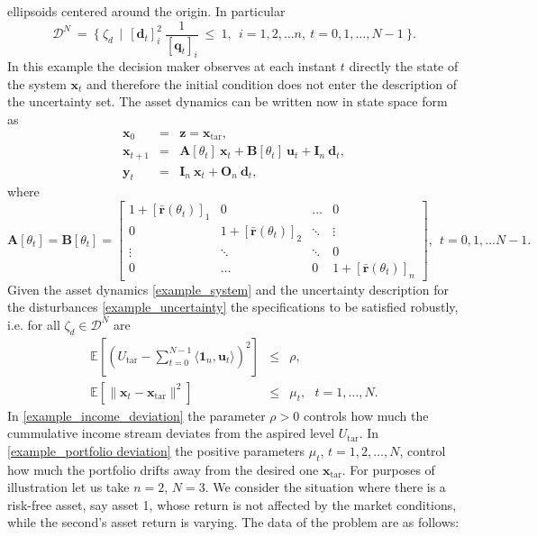 \documentclass[letterpaper,11pt]{article}
\newcommand{\AR}[2]{\left[\begin{array}{#1}#2\end{array}\right]}
\begin{document}
ellipsoids centered around the origin. 
In particular 
\begin{equation}
\label{example_uncertainty}
\mathcal{D}^N ~=~ \{~ \zeta_d ~~ |~~  [\mathbf{d}_{t}]_i^2  ~ \frac{1}{[\mathbf{q}_{t}]_i} ~ \leq ~ 1, ~~ i = 1, 2, \hdots n, ~ t = 0,1, \hdots, N-1 ~\}.
\end{equation}
In this example the decision maker observes at each instant $t$ directly the  state of the system $ \mathbf{x}_t$
and therefore the initial condition does not enter the description of the uncertainty set. 
The asset dynamics can be written now in state space form as
\begin{eqnarray}
\label{example_system}
\nonumber
\mathbf{x}_0 & = & \mathbf{z} = \mathbf{x}_{\text{tar}}, \\
\nonumber
\mathbf{x}_{t+1} & = &  \mathbf{A}[\theta_t] ~ \mathbf{x}_t + \mathbf{B}[\theta_t] ~ \mathbf{u}_t + 
\mathbf{I}_n ~ \mathbf{d}_t,  \\
\mathbf{y}_t  & = &\mathbf{I}_n ~ \mathbf{x}_t + \mathbf{O}_n ~ \mathbf{d}_t, 
\end{eqnarray}
where 
$$
\mathbf{A}[\theta_t] = \mathbf{B}[\theta_t] = \AR{cccc}{   1 +  [ \bar{\mathbf{r}}(\theta_t)]_1  & 0& \hdots & 0\\ 
	0	&  1 +  [ \bar{\mathbf{r}}(\theta_t)]_2 & \ddots& \vdots\\
	\vdots & \ddots & \ddots & 0\\ 
	0& \hdots & 0&  1 +  [ \bar{\mathbf{r}}(\theta_t)]_n}, ~~t =0,1, \hdots N-1.
$$
Given the asset dynamics \eqref{example_system} and the uncertainty description for the disturbances 
\eqref{example_uncertainty} the specifications to be satisfied robustly, i.e. for all $\zeta_d \in  \mathcal{D}^N$ are
\begin{eqnarray}
\label{example_income_deviation}
\mathbb{E}[(U_{\text{tar}} -\sum_{t=0}^{N-1} \langle \mathbf{1}_n, \mathbf{u}_t \rangle)^2  ] 
& \leq &\rho, \\
\label{example_portfolio deviation}
\mathbb{E}[ \|\mathbf{x}_t-\mathbf{x}_{\text{tar}} \|^2  ] & \leq & \mu_t,~~~ t = 1, \hdots, N.
\end{eqnarray}
In \eqref{example_income_deviation} the parameter $ \rho > 0 $ controls how much 
the cummulative income stream deviates from the aspired level $ U_{\text{tar}}$.
In \eqref{example_portfolio deviation} the positive parameters 
$ \mu_t $, $t=1,2, \hdots, N$,  control how much 
the portfolio drifts away from the desired one $ \mathbf{x}_{\text{tar}}$.
For purposes of illustration let us take $n = 2$, $N  = 3$. We consider the situation
where there is a risk-free asset, say asset 1, whose return  is not
affected by the market conditions, while the second's asset return is varying.  The data of the problem are as follows:
\end{document}
